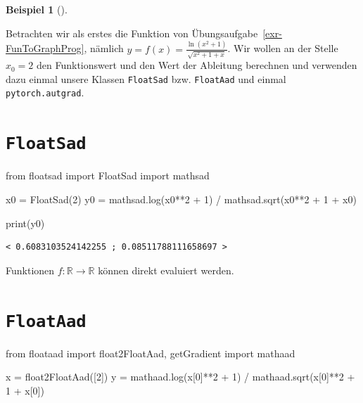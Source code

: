 \documentclass[
  a4paper,
  DIV=11]{scrreprt}
\newenvironment{Shaded}{\begin{snugshade}}{\end{snugshade}}
\newcommand{\BuiltInTok}[1]{\textcolor[rgb]{0.00,0.23,0.31}{#1}}
\newcommand{\DecValTok}[1]{\textcolor[rgb]{0.68,0.00,0.00}{#1}}
\newcommand{\ImportTok}[1]{\textcolor[rgb]{0.00,0.46,0.62}{#1}}
\newcommand{\NormalTok}[1]{\textcolor[rgb]{0.00,0.23,0.31}{#1}}
\newcommand{\OperatorTok}[1]{\textcolor[rgb]{0.37,0.37,0.37}{#1}}
\theoremstyle{definition}
\theoremstyle{definition}
\newtheorem{example}{Beispiel}[chapter]
\theoremstyle{remark}
\begin{document}
\begin{example}[]\protect\hypertarget{exm-FunctionEvaluationPyTorch}{}\label{exm-FunctionEvaluationPyTorch}

Betrachten wir als erstes die Funktion von
Übungsaufgabe~\ref{exr-FunToGraphProg}, nämlich
\(y = f(x) = \frac{\ln(x^2 + 1)}{\sqrt{x^2 + 1 + x}}\). Wir wollen an
der Stelle \(x_0 = 2\) den Funktionswert und den Wert der Ableitung
berechnen und verwenden dazu einmal unsere Klassen \texttt{FloatSad}
bzw. \texttt{FloatAad} und einmal \texttt{pytorch.autgrad}.

\section{\texorpdfstring{\texttt{FloatSad}}{FloatSad}}

\begin{Shaded}
\begin{Highlighting}[]
\ImportTok{from}\NormalTok{ floatsad }\ImportTok{import}\NormalTok{ FloatSad}
\ImportTok{import}\NormalTok{ mathsad}

\NormalTok{x0 }\OperatorTok{=}\NormalTok{ FloatSad(}\DecValTok{2}\NormalTok{)}
\NormalTok{y0 }\OperatorTok{=}\NormalTok{ mathsad.log(x0}\OperatorTok{**}\DecValTok{2} \OperatorTok{+} \DecValTok{1}\NormalTok{) }\OperatorTok{/}\NormalTok{ mathsad.sqrt(x0}\OperatorTok{**}\DecValTok{2} \OperatorTok{+} \DecValTok{1} \OperatorTok{+}\NormalTok{ x0)}

\BuiltInTok{print}\NormalTok{(y0)}
\end{Highlighting}
\end{Shaded}

\begin{verbatim}
< 0.6083103524142255 ; 0.08511788111658697 >
\end{verbatim}

Funktionen \(f:\mathbb{R} \rightarrow \mathbb{R}\) können direkt
evaluiert werden.

\section{\texorpdfstring{\texttt{FloatAad}}{FloatAad}}

\begin{Shaded}
\begin{Highlighting}[]
\ImportTok{from}\NormalTok{ floataad }\ImportTok{import}\NormalTok{ float2FloatAad, getGradient}
\ImportTok{import}\NormalTok{ mathaad}

\NormalTok{x }\OperatorTok{=}\NormalTok{ float2FloatAad([}\DecValTok{2}\NormalTok{])}
\NormalTok{y }\OperatorTok{=}\NormalTok{ mathaad.log(x[}\DecValTok{0}\NormalTok{]}\OperatorTok{**}\DecValTok{2} \OperatorTok{+} \DecValTok{1}\NormalTok{) }\OperatorTok{/}\NormalTok{ mathaad.sqrt(x[}\DecValTok{0}\NormalTok{]}\OperatorTok{**}\DecValTok{2} \OperatorTok{+} \DecValTok{1} \OperatorTok{+}\NormalTok{ x[}\DecValTok{0}\NormalTok{])}


\end{Highlighting}
\end{Shaded}
\end{example}
\end{document}
